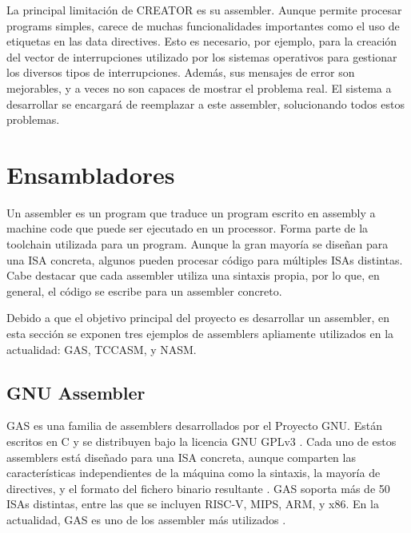 La principal limitación de CREATOR es su \gls{assembler}. Aunque permite
procesar \glspl{program} simples, carece de muchas funcionalidades importantes
como el uso de etiquetas en las \glspl{data directive}. Esto es necesario, por
ejemplo, para la creación del vector de interrupciones utilizado por los
sistemas operativos para gestionar los diversos tipos de interrupciones. Además,
sus mensajes de error son mejorables, y a veces no son capaces de mostrar el
problema real. El sistema a desarrollar se encargará de reemplazar a este
\gls{assembler}, solucionando todos estos problemas.


\section{Ensambladores}\label{sec:assemblers}

Un \gls{assembler} es un \gls{program} que traduce un \gls{program} escrito en
\gls{assembly} a \gls{machine code} que puede ser ejecutado en un
\gls{processor}. Forma parte de la \gls{toolchain} utilizada para
 un \gls{program}. Aunque la gran mayoría se
diseñan para una \gls{ISA} concreta, algunos pueden procesar código para
múltiples \glspl{ISA} distintas. Cabe destacar que cada \gls{assembler} utiliza
una sintaxis propia, por lo que, en general, el código se escribe para un
\gls{assembler} concreto.

Debido a que el objetivo principal del proyecto es desarrollar un
\gls{assembler}, en esta sección se exponen tres ejemplos de \glspl{assembler}
apliamente utilizados en la actualidad: \gls{GAS}, TCCASM, y NASM.

\subsection{GNU Assembler}

\gls{GAS} \parencite{GNUas} es una familia de \glspl{assembler} desarrollados
por el Proyecto GNU. Están escritos en C y se distribuyen bajo la licencia GNU
GPLv3 \parencite{gpl}. Cada uno de estos \glspl{assembler} está diseñado para
una \gls{ISA} concreta, aunque comparten las características independientes de
la máquina como la sintaxis, la mayoría de \glspl{directive}, y el formato del
fichero binario resultante \parencite{as-manual}. \gls{GAS} soporta más de 50
\glspl{ISA} distintas, entre las que se incluyen RISC-V, MIPS, ARM, y x86. En la
actualidad, \gls{GAS} es uno de los \gls{assembler} más utilizados
\parencite{assembler-usage}.

